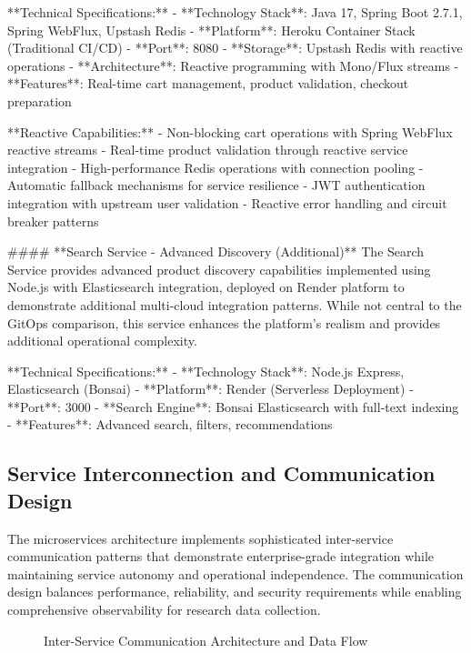**Technical Specifications:**
- **Technology Stack**: Java 17, Spring Boot 2.7.1, Spring WebFlux, Upstash Redis
- **Platform**: Heroku Container Stack (Traditional CI/CD)
- **Port**: 8080
- **Storage**: Upstash Redis with reactive operations
- **Architecture**: Reactive programming with Mono/Flux streams
- **Features**: Real-time cart management, product validation, checkout preparation

**Reactive Capabilities:**
- Non-blocking cart operations with Spring WebFlux reactive streams
- Real-time product validation through reactive service integration
- High-performance Redis operations with connection pooling
- Automatic fallback mechanisms for service resilience
- JWT authentication integration with upstream user validation
- Reactive error handling and circuit breaker patterns

#### **Search Service - Advanced Discovery (Additional)**
The Search Service provides advanced product discovery capabilities implemented using Node.js with Elasticsearch integration, deployed on Render platform to demonstrate additional multi-cloud integration patterns. While not central to the GitOps comparison, this service enhances the platform's realism and provides additional operational complexity.

**Technical Specifications:**
- **Technology Stack**: Node.js Express, Elasticsearch (Bonsai)
- **Platform**: Render (Serverless Deployment)
- **Port**: 3000
- **Search Engine**: Bonsai Elasticsearch with full-text indexing
- **Features**: Advanced search, filters, recommendations

\subsection{Service Interconnection and Communication Design}

The microservices architecture implements sophisticated inter-service communication patterns that demonstrate enterprise-grade integration while maintaining service autonomy and operational independence. The communication design balances performance, reliability, and security requirements while enabling comprehensive observability for research data collection.

\begin{figure}[H]
\centering
\caption{Inter-Service Communication Architecture and Data Flow}
\label{fig:service-communication-patterns}
\end{figure}

